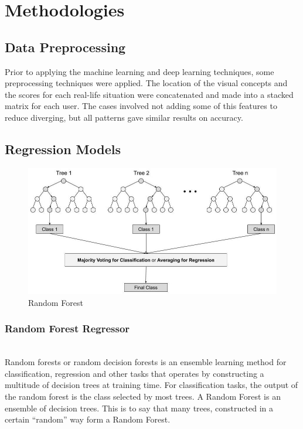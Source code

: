 \documentclass{llncs}
\begin{document}
\section{Methodologies}
\subsection{Data Preprocessing} 
Prior to applying the machine learning and deep learning techniques, some preprocessing techniques were applied. The location of the visual concepts and the scores for each real-life situation were concatenated and made into a stacked matrix for each user. The cases involved not adding some of this features to reduce diverging, but all patterns gave similar results on accuracy.

\subsection{Regression Models}
\label{Model1Architecture}

\begin{figure}[h]
    \centering
    \includegraphics[width=\textwidth,height=\textheight,keepaspectratio]{Random_forest.jpg}
    \caption{Random Forest}
    \label{fig:Model}
\end{figure}


\subsubsection{Random Forest Regressor}
\hfill\\Random forests or random decision forests is an ensemble learning method for classification, regression and other tasks that operates by constructing a multitude of decision trees at training time. For classification tasks, the output of the random forest is the class selected by most trees. A Random Forest\cite{ajesh2016random} is an ensemble of decision trees. This is to say that many trees, constructed in a certain “random” way form a Random Forest. 
\end{document}
